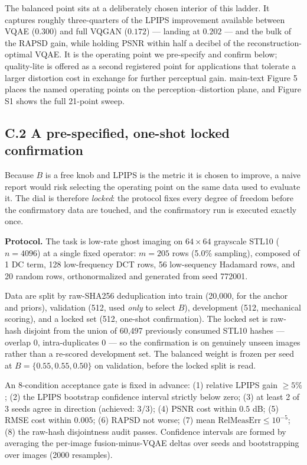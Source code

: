 \documentclass[11pt]{article}
\begin{document}
The balanced point sits at a deliberately chosen interior of this ladder. It captures roughly three-quarters of the LPIPS improvement available between VQAE ($0.300$) and full VQGAN ($0.172$) --- landing at $0.202$ --- and the bulk of the RAPSD gain, while holding PSNR within half a decibel of the reconstruction-optimal VQAE. It is the operating point we pre-specify and confirm below; quality-lite is offered as a second registered point for applications that tolerate a larger distortion cost in exchange for further perceptual gain. main-text Figure 5 places the named operating points on the perception--distortion plane, and Figure S1 shows the full 21-point sweep.



\subsection*{C.2 A pre-specified, one-shot locked confirmation}

Because $B$ is a free knob and LPIPS is the metric it is chosen to improve, a naive report would risk selecting the operating point on the same data used to evaluate it. The dial is therefore \textit{locked}: the protocol fixes every degree of freedom before the confirmatory data are touched, and the confirmatory run is executed exactly once.

\textbf{Protocol.} The task is low-rate ghost imaging on $64\times64$ grayscale STL10 ($n = 4096$) at a single fixed operator: $m = 205$ rows (5.0\% sampling), composed of 1 DC term, 128 low-frequency DCT rows, 56 low-sequency Hadamard rows, and 20 random rows, orthonormalized and generated from seed 772001.

Data are split by raw-SHA256 deduplication into train (20,000, for the anchor and priors), validation (512, used \textit{only} to select $B$), development (512, mechanical scoring), and a locked set (512, one-shot confirmation). The locked set is raw-hash disjoint from the union of 60,497 previously consumed STL10 hashes --- overlap $0$, intra-duplicates $0$ --- so the confirmation is on genuinely unseen images rather than a re-scored development set. The balanced weight is frozen per seed at $B = \{0.55, 0.55, 0.50\}$ on validation, before the locked split is read.

An 8-condition acceptance gate is fixed in advance: (1) relative LPIPS gain $\ge 5\%$; (2) the LPIPS bootstrap confidence interval strictly below zero; (3) at least 2 of 3 seeds agree in direction (achieved: 3/3); (4) PSNR cost within $0.5$ dB; (5) RMSE cost within $0.005$; (6) RAPSD not worse; (7) mean $\mathrm{RelMeasErr} \le 10^{-5}$; (8) the raw-hash disjointness audit passes. Confidence intervals are formed by averaging the per-image fusion-minus-VQAE deltas over seeds and bootstrapping over images (2000 resamples).
\end{document}
